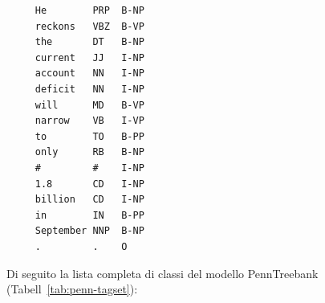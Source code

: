 \begin{center}
  \begin{minipage}{5cm}
    \begin{verbatim}
     He        PRP  B-NP
     reckons   VBZ  B-VP
     the       DT   B-NP
     current   JJ   I-NP
     account   NN   I-NP
     deficit   NN   I-NP
     will      MD   B-VP
     narrow    VB   I-VP
     to        TO   B-PP
     only      RB   B-NP
     #         #    I-NP
     1.8       CD   I-NP
     billion   CD   I-NP
     in        IN   B-PP
     September NNP  B-NP
     .         .    O
    \end{verbatim}
  \end{minipage}
\end{center}

Di seguito la lista completa di classi del modello PennTreebank (Tabell~\ref{tab:penn-tagset}):

